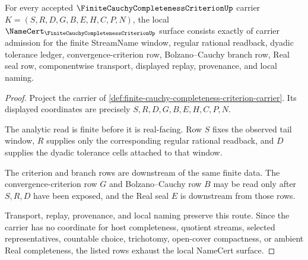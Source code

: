 \begin{theorem}
\label{thm:finite-cauchy-completeness-criterion-namecert-obligations}
For every accepted $\FiniteCauchyCompletenessCriterionUp$ carrier $K=(S,R,D,G,B,E,H,C,P,N)$, the local $\NameCert_{\FiniteCauchyCompletenessCriterionUp}$ surface consists exactly of carrier admission for the finite StreamName window, regular rational readback, dyadic tolerance ledger, convergence-criterion row, Bolzano--Cauchy branch row, Real seal row, componentwise transport, displayed replay, provenance, and local naming.
\end{theorem}
\begin{proof}
Project the carrier of \autoref{def:finite-cauchy-completeness-criterion-carrier}. Its displayed coordinates are precisely $S,R,D,G,B,E,H,C,P,N$.

The analytic read is finite before it is real-facing. Row $S$ fixes the observed tail window, $R$ supplies only the corresponding regular rational readback, and $D$ supplies the dyadic tolerance cells attached to that window.

The criterion and branch rows are downstream of the same finite data. The convergence-criterion row $G$ and Bolzano--Cauchy row $B$ may be read only after $S,R,D$ have been exposed, and the Real seal $E$ is downstream from those rows.

Transport, replay, provenance, and local naming preserve this route. Since the carrier has no coordinate for host completeness, quotient streams, selected representatives, countable choice, trichotomy, open-cover compactness, or ambient Real completeness, the listed rows exhaust the local NameCert surface.
\end{proof}

